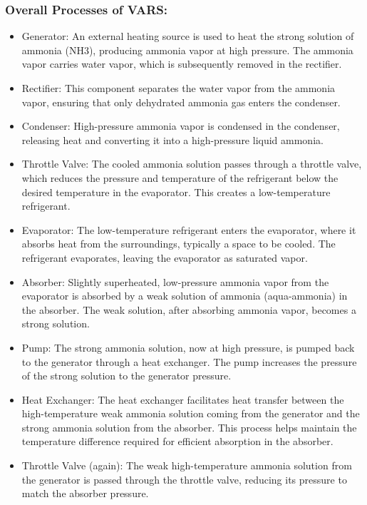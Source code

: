\documentclass{article}
\begin{document}
\subsubsection*{Overall Processes of VARS:}
\begin{itemize}
  \item Generator: An external heating source is used to heat the strong solution of ammonia (NH3), producing ammonia vapor at high pressure. The ammonia vapor carries water vapor, which is subsequently removed in the rectifier.
  \item Rectifier: This component separates the water vapor from the ammonia vapor, ensuring that only dehydrated ammonia gas enters the condenser.
  \item Condenser: High-pressure ammonia vapor is condensed in the condenser, releasing heat and converting it into a high-pressure liquid ammonia.
  \item Throttle Valve: The cooled ammonia solution passes through a throttle valve, which reduces the pressure and temperature of the refrigerant below the desired temperature in the evaporator. This creates a low-temperature refrigerant.
  \item Evaporator: The low-temperature refrigerant enters the evaporator, where it absorbs heat from the surroundings, typically a space to be cooled. The refrigerant evaporates, leaving the evaporator as saturated vapor.
  \item Absorber: Slightly superheated, low-pressure ammonia vapor from the evaporator is absorbed by a weak solution of ammonia (aqua-ammonia) in the absorber. The weak solution, after absorbing ammonia vapor, becomes a strong solution.
  \item Pump: The strong ammonia solution, now at high pressure, is pumped back to the generator through a heat exchanger. The pump increases the pressure of the strong solution to the generator pressure.
  \item Heat Exchanger: The heat exchanger facilitates heat transfer between the high-temperature weak ammonia solution coming from the generator and the strong ammonia solution from the absorber. This process helps maintain the temperature difference required for efficient absorption in the absorber.
  \item Throttle Valve (again): The weak high-temperature ammonia solution from the generator is passed through the throttle valve, reducing its pressure to match the absorber pressure.
\end{itemize}
\end{document}
